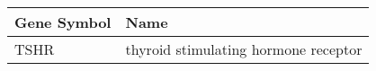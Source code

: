 \begin{tabular}{ll}
\toprule
Gene Symbol &                                 Name \\
\midrule
       TSHR & thyroid stimulating hormone receptor \\
\bottomrule
\end{tabular}
